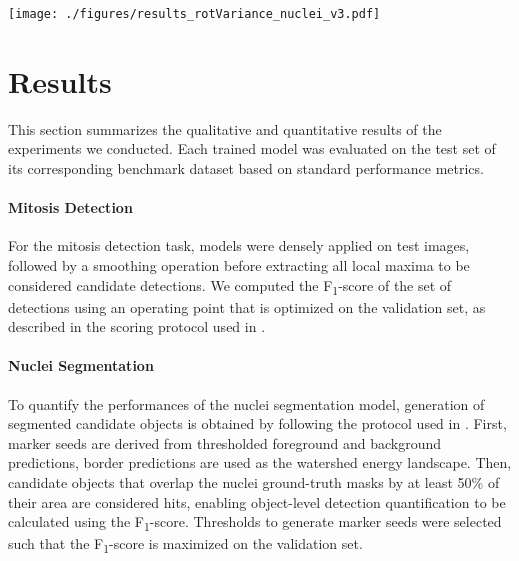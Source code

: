 \documentclass[twocolumn,final]{article}
\newcommand{\fscore}[1]{F\textsubscript{#1}-score}
\begin{document}
\begin{figure*}[ht!]
\begin{center}
\texttt{[image: ./figures/results\_rotVariance\_nuclei\_v3.pdf]}
\caption{\footnotesize
Example of image patches selected from the test set of the nuclei segmentation benchmark (column 1-2: breast tissue, column 3-4: prostate tissue, column 5: kidney tissue, column 6: liver).
For each image, and a selection of models, the raw predictions of the nucleus boundary class were computed and stored for the set of rotated inputs using steps of $\pi / 8$ rad.
Predictions were re-aligned and their means were mapped to gray-scale and the standard deviations of the predictions were mapped to a white-to-red color scale.
The overlap of these statistics is shown below each original image.
Selected models are the best obtained models that were trained without reduced data regime over repeats (based on their \fscore{1}).
}
\label{fig:resultsQualitativeNuclei}
\end{center}
\end{figure*}

\section{Results}
\label{sec:results}
This section summarizes the qualitative and quantitative results of the experiments we conducted.
Each trained model was evaluated on the test set of its corresponding benchmark dataset based on standard performance metrics.

\paragraph{Mitosis Detection}
For the mitosis detection task, models were densely applied on test images, followed by a smoothing operation before extracting all local maxima to be considered candidate detections.
We computed the \fscore{1} of the set of detections using an operating point that is optimized on the validation set, as described in the scoring protocol used in \citep{veta2015assessment}.

\paragraph{Nuclei Segmentation}
To quantify the performances of the nuclei segmentation model, generation of segmented candidate objects is obtained by following the protocol used in \citep{kumar2017dataset, lafarge2019domain}.
First, marker seeds are derived from thresholded foreground and background predictions, border predictions are used as the watershed energy landscape.
Then, candidate objects that overlap the nuclei ground-truth masks by at least 50\% of their area are considered hits, enabling object-level detection quantification to be calculated using the \fscore{1}.
Thresholds to generate marker seeds were selected such that the \fscore{1} is maximized on the validation set.
\end{document}
